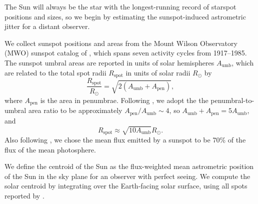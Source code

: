 The Sun will always be the star with the longest-running record of starspot positions and sizes, so we begin by estimating the sunspot-induced astrometric jitter for a distant observer. 

We collect sunspot positions and areas from the Mount Wilson Observatory (MWO) sunspot catalog of \citet{Howard1984}, which spans seven activity cycles from 1917--1985. The sunspot umbral areas are reported in units of solar hemispheres $A_{\mathrm{umb}}$, which are related to the total spot radii $R_{\mathrm{spot}}$ in units of solar radii $R_\odot$ by
\begin{equation}
\frac{R_{\mathrm{spot}}}{R_\odot} = \sqrt{2 (A_{\mathrm{umb}} + A_{\mathrm{pen}})},
\end{equation}
where $A_{\mathrm{pen}}$ is the area in penumbrae. Following \citet{Solanki2003}, we adopt the the penumbral-to-umbral area ratio to be approximately $A_{\mathrm{pen}}/A_{\mathrm{umb}} \sim 4$, so $A_{\mathrm{umb}} + A_{\mathrm{pen}} = 5 A_{\mathrm{umb}}$, and 
\begin{equation}
R_{\mathrm{spot}} \approx \sqrt{10 A_{\mathrm{umb}}} R_\odot.
\end{equation}
Also following \citet{Solanki2003}, we chose the mean flux emitted by a sunspot to be 70\% of the flux of the mean photosphere. 

We define the centroid of the Sun as the flux-weighted mean astrometric position of the Sun in the sky plane for an observer with perfect seeing. We compute the solar centroid by integrating over the Earth-facing solar surface, using all spots reported by \citet{Howard1984}. 

